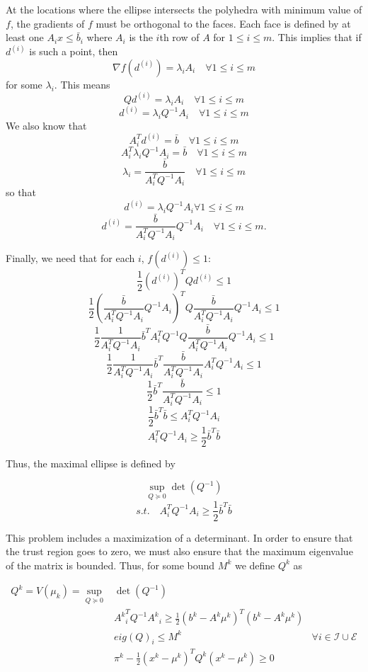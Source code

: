 \documentclass{article}
\begin{document}
At the locations where the ellipse intersects the polyhedra with minimum value of $f$, the gradients of $f$ must be orthogonal to the faces.
Each face is defined by at least one $A_i x \le \bar{b}_i$ where $A_i$ is the $i$th row of $A$ for $1\le i \le m$.
This implies that if $d^{(i)}$ is such a point, then
\[
\nabla f(d^{(i)}) = \lambda_i A_i \quad \forall 1\le i\le m
\]
for some $\lambda_i$.
This means
\[
Q d^{(i)} = \lambda_i A_i \quad \forall 1\le i\le m
\]
\[
d^{(i)} = \lambda_i Q^{-1}A_i \quad \forall 1\le i\le m
\]
We also know that 
\[
A_i^T d^{(i)} = \bar{b} \quad \forall 1\le i\le m
\]
\[
A_i^T \lambda_i Q^{-1}A_i = \bar{b} \quad \forall 1\le i\le m
\]
\[
\lambda_i = \frac {\bar{b}}{A_i^T  Q^{-1}A_i} \quad \forall 1\le i\le m
\]
so that 
\[
d^{(i)} = \lambda_i Q^{-1}A_i \forall 1\le i\le m
\]
\[
d^{(i)} = \frac {\bar{b}}{A_i^T  Q^{-1}A_i}  Q^{-1}A_i \quad \forall 1\le i\le m.
\]

Finally, we need that for each $i$, $f(d^{(i)}) \le 1$:
\[
\frac 1 2 (d^{(i)})^{T} Q d^{(i)} \le 1
\]
\[
\frac 1 2 (\frac {\bar{b}}{A_i^T  Q^{-1}A_i}  Q^{-1}A_i)^{T} Q \frac {\bar{b}}{A_i^T  Q^{-1}A_i}  Q^{-1}A_i \le 1
\]
\[
\frac 1 2 \frac {1}{A_i^T  Q^{-1}A_i}  \bar{b}^T A_i^T Q^{-1} Q \frac {\bar{b}}{A_i^T  Q^{-1}A_i}  Q^{-1}A_i \le 1
\]
\[
\frac 1 2 \frac {1}{A_i^T  Q^{-1}A_i}  \bar{b}^T \frac {\bar{b}}{A_i^T  Q^{-1}A_i}  A_i^T Q^{-1}A_i \le 1
\]
\[
\frac 1 2 \bar{b}^T \frac {\bar{b}}{A_i^T  Q^{-1}A_i} \le 1
\]
\[
\frac 1 2 \bar{b}^T \bar{b}\le A_i^T  Q^{-1}A_i
\]
\[
A_i^T  Q^{-1}A_i \ge \frac 1 2 \bar{b}^T \bar{b}
\]

Thus, the maximal ellipse is defined by

\[
\sup_{Q \succeq 0} \det(Q^{-1})
\]
\[
s.t. \quad A_i^T Q^{-1} A_i \ge \frac 1 2 \bar{b}^T\bar{b}
\]


This problem includes a maximization of a determinant.
In order to ensure that the trust region goes to zero, we must also ensure that the maximum eigenvalue of the matrix is bounded.
Thus, for some bound $M^k$ we define $Q^k$ as

\begin{center}
\begin{align}
\label{ellipse_1}
Q^k = V(\mu_k) = \sup_{Q \succeq 0} & \det(Q^{-1}) & \\
  & {A^k}_i^T Q^{-1} {A^k}_i \ge \frac 1 2 (b^k - A^k\mu^{k})^T(b^k - A^k \mu^{k}) & \\
  & eig(Q)_i \le M^k & \forall i \in \mathcal I \cup \mathcal E \\
  & \pi^k - \frac 1 2 (x^k - \mu^{k})^TQ^{k}(x^k - \mu^{k}) \ge 0
\end{align}
\end{center}
\end{document}

